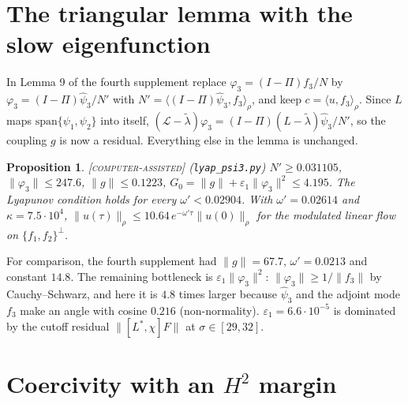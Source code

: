 \documentclass[11pt]{amsart}
\newtheorem{proposition}[theorem]{Proposition}
\theoremstyle{remark}
\newcommand{\eps}{\varepsilon}
\newcommand{\ip}[2]{\langle #1,#2\rangle}
\newcommand{\lab}[1]{\textup{\textsc{[#1]}}}
\begin{document}
\section{The triangular lemma with the slow eigenfunction}\label{sec:tri}

In Lemma 9 of the fourth supplement replace $\varphi_3=(I-\Pi)f_3/N$ by $\varphi_3=(I-\Pi)\hat\psi_3/N'$ with $N'=\ip{(I-\Pi)\hat\psi_3}{f_3}_\rho$, and keep $c=\ip{u}{f_3}_\rho$. Since $L$ maps $\mathrm{span}\{\psi_1,\psi_2\}$ into itself, $(\mathcal L-\tilde\lambda)\varphi_3=(I-\Pi)(L-\tilde\lambda)\hat\psi_3/N'$, so the coupling $g$ is now a residual. Everything else in the lemma is unchanged.

\begin{proposition}\label{prop:tri}\lab{computer-assisted} (\texttt{lyap\_psi3.py})
$N'\ge0.031105$, $\|\varphi_3\|\le247.6$, $\|g\|\le0.1223$, $G_0=\|g\|+\eps_1\|\varphi_3\|^2\le4.195$. The Lyapunov condition holds for every $\omega'<0.02904$. With $\omega'=0.02614$ and $\kappa=7.5\cdot10^4$, $\|u(\tau)\|_\rho\le10.64\,e^{-\omega'\tau}\|u(0)\|_\rho$ for the modulated linear flow on $\{f_1,f_2\}^\perp$.
\end{proposition}
For comparison, the fourth supplement had $\|g\|=67.7$, $\omega'=0.0213$ and constant $14.8$. The remaining bottleneck is $\eps_1\|\varphi_3\|^2$: $\|\varphi_3\|\ge1/\|f_3\|$ by Cauchy--Schwarz, and here it is $4.8$ times larger because $\hat\psi_3$ and the adjoint mode $f_3$ make an angle with cosine $0.216$ (non-normality). $\eps_1=6.6\cdot10^{-5}$ is dominated by the cutoff residual $\|[L^*,\chi]F\|$ at $\sigma\in[29,32]$.

\section{Coercivity with an $H^2$ margin}\label{sec:theta}
\end{document}
